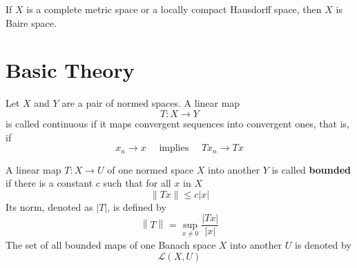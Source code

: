 \documentclass[12pt, oneside]{book}
\begin{document}
\begin{theorem}
    If $X$ is a complete metric space or a locally compact Hausdorff space, then $X$ is Baire space.
\end{theorem}







\section{Basic Theory}
\begin{definition}
    Let $X$ and $Y$ are a pair of normed spaces. A linear map
    \begin{equation*}
        T: X \rightarrow Y
    \end{equation*}
    is called continuous if it maps convergent sequences into convergent ones, that is, if
    \begin{equation*}
        x_n \longrightarrow x \quad \text { implies } \quad T x_n \longrightarrow T x
    \end{equation*}

\end{definition}
\begin{definition}
    A linear map $T: X \rightarrow U$ of one normed space $X$ into another $Y$ is called \textbf{bounded} if there is a constant $c$ such that for all $x$ in $X$
    \begin{equation*}
        \|T x\| \leq c|x|
    \end{equation*}
    Its norm, denoted as $|T|$, is defined by
    \begin{equation*}
        \left\| T\right\|_{}
        =
        \sup _{x \neq 0} \frac{|T x|}{|x|}
    \end{equation*}
    The set of all bounded maps of one Banach space $X$ into another $U$ is denoted by
    \begin{equation*}
        \mathcal{L}(X, U)
    \end{equation*}
\end{definition}
\end{document}
